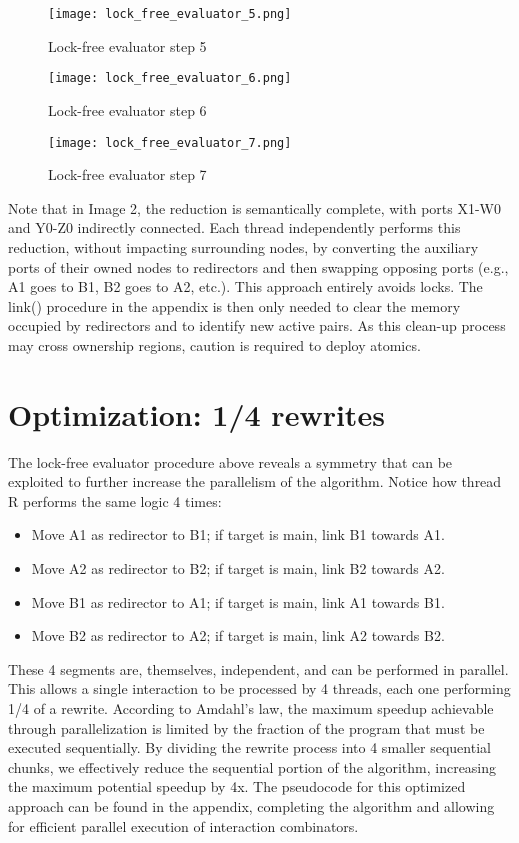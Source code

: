\documentclass{article}
\begin{document}
\begin{figure}[h!]
\centering
\texttt{[image: lock\_free\_evaluator\_5.png]}
\caption{Lock-free evaluator step 5}
\end{figure}

\begin{figure}[h!]
\centering
\texttt{[image: lock\_free\_evaluator\_6.png]}
\caption{Lock-free evaluator step 6}
\end{figure}

\begin{figure}[h!]
\centering
\texttt{[image: lock\_free\_evaluator\_7.png]}
\caption{Lock-free evaluator step 7}
\end{figure}

Note that in Image 2, the reduction is semantically complete, with ports X1-W0 and Y0-Z0 indirectly connected. Each thread independently performs this reduction, without impacting surrounding nodes, by converting the auxiliary ports of their owned nodes to redirectors and then swapping opposing ports (e.g., A1 goes to B1, B2 goes to A2, etc.). This approach entirely avoids locks. The link() procedure in the appendix is then only needed to clear the memory occupied by redirectors and to identify new active pairs. As this clean-up process may cross ownership regions, caution is required to deploy atomics.

\section{Optimization: 1/4 rewrites}\label{s:lockfree}

The lock-free evaluator procedure above reveals a symmetry that can be exploited to further increase the parallelism of the algorithm. Notice how thread R performs the same logic 4 times:

\begin{itemize}
  \item Move A1 as redirector to B1; if target is main, link B1 towards A1.
  \item Move A2 as redirector to B2; if target is main, link B2 towards A2.
  \item Move B1 as redirector to A1; if target is main, link A1 towards B1.
  \item Move B2 as redirector to A2; if target is main, link A2 towards B2.
\end{itemize}

These 4 segments are, themselves, independent, and can be performed in parallel. This allows a single interaction to be processed by 4 threads, each one performing 1/4 of a rewrite. According to Amdahl's law, the maximum speedup achievable through parallelization is limited by the fraction of the program that must be executed sequentially. By dividing the rewrite process into 4 smaller sequential chunks, we effectively reduce the sequential portion of the algorithm, increasing the maximum potential speedup by 4x. The pseudocode for this optimized approach can be found in the appendix, completing the algorithm and allowing for efficient parallel execution of interaction combinators.
\end{document}
